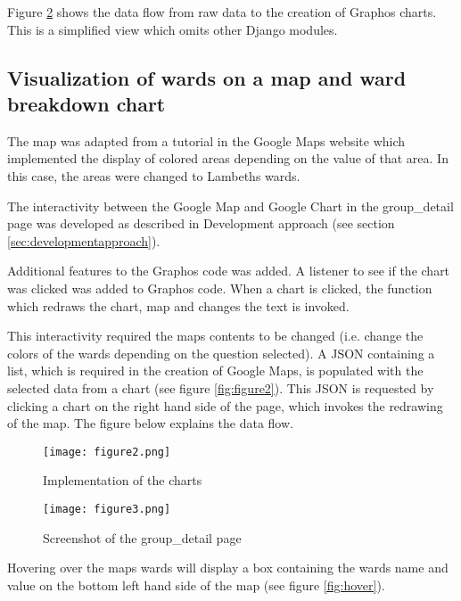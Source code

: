 Figure \ref{fig:figure1} shows the data flow from raw data to the creation of Graphos charts. This is a simplified view which omits other Django modules.

\subsection{Visualization of wards on a map and ward breakdown chart}

The map was adapted from a tutorial in the Google Maps website which implemented the display of colored areas depending on the value of that area. In this case, the areas were changed to Lambeth\textquotesingle s wards.\par

The interactivity between the Google Map and Google Chart in the group\_detail page was developed as described in Development approach (see section \ref{sec:developmentapproach}). \par

Additional features to the Graphos code was added. A listener to see if the chart was clicked was added to Graphos\textsc{} code. When a chart is clicked, the function which redraws the chart, map and changes the text is invoked. \par

This interactivity required the map\textquotesingle s contents to be changed (i.e. change the colors of the wards depending on the question selected). A JSON containing a list, which is required in the creation of Google Maps, is populated with the selected data from a chart (see figure \ref{fig:figure2}). This JSON is requested by clicking a chart on the right hand side of the page, which invokes the redrawing of the map. The figure below explains the data flow.

\begin{figure}[h]
\centering
\texttt{[image: figure2.png]}
\caption{Implementation of the charts}
\label{fig:figure1}
\end{figure}

\begin{figure}[h]
\centering
\texttt{[image: figure3.png]}
\caption{Screenshot of the group\_detail page}
\label{fig:figure1}
\end{figure}

Hovering over the map\textquotesingle s wards will display a box containing the ward\textquotesingle s name and value on the bottom left hand side of the map (see figure \ref{fig:hover}).

